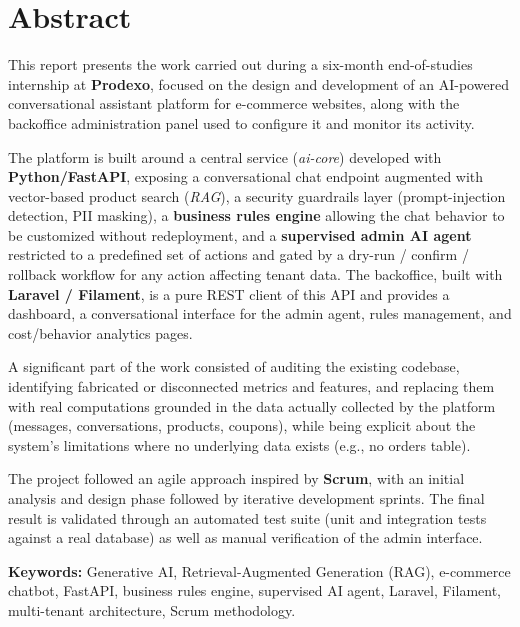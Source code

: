\bigskip
\bigskip

\chapter*{Abstract}

This report presents the work carried out during a six-month end-of-studies internship at \textbf{Prodexo}, focused on the design and development of an AI-powered conversational assistant platform for e-commerce websites, along with the backoffice administration panel used to configure it and monitor its activity.

The platform is built around a central service (\emph{ai-core}) developed with \textbf{Python/FastAPI}, exposing a conversational chat endpoint augmented with vector-based product search (\emph{RAG}), a security guardrails layer (prompt-injection detection, PII masking), a \textbf{business rules engine} allowing the chat behavior to be customized without redeployment, and a \textbf{supervised admin AI agent} restricted to a predefined set of actions and gated by a dry-run / confirm / rollback workflow for any action affecting tenant data. The backoffice, built with \textbf{Laravel / Filament}, is a pure REST client of this API and provides a dashboard, a conversational interface for the admin agent, rules management, and cost/behavior analytics pages.

A significant part of the work consisted of auditing the existing codebase, identifying fabricated or disconnected metrics and features, and replacing them with real computations grounded in the data actually collected by the platform (messages, conversations, products, coupons), while being explicit about the system's limitations where no underlying data exists (e.g., no orders table).

The project followed an agile approach inspired by \textbf{Scrum}, with an initial analysis and design phase followed by iterative development sprints. The final result is validated through an automated test suite (unit and integration tests against a real database) as well as manual verification of the admin interface.

\vspace{0.5cm}
\noindent\textbf{Keywords:} Generative AI, Retrieval-Augmented Generation (RAG), e-commerce chatbot, FastAPI, business rules engine, supervised AI agent, Laravel, Filament, multi-tenant architecture, Scrum methodology.
